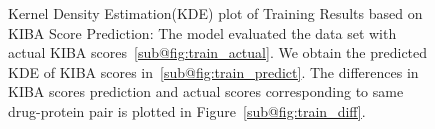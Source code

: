 \begin{figure}[H]
    \centering
     \qquad

    \caption[Training Results based on KIBA Score Prediction]{Kernel Density Estimation(KDE) plot of Training Results based on KIBA Score Prediction: The model evaluated the data set with actual KIBA scores~\ref{sub@fig:train_actual}. We obtain the predicted KDE of KIBA scores in~\ref{sub@fig:train_predict}. The differences in KIBA scores prediction and actual scores corresponding to same drug-protein pair is plotted in Figure~\ref{sub@fig:train_diff}.}
    \label{fig:pred_train}
\end{figure}

